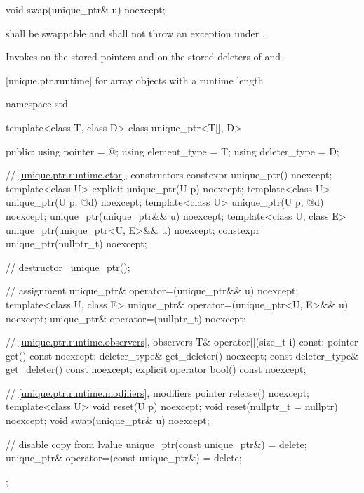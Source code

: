 %
\begin{itemdecl}
void swap(unique_ptr& u) noexcept;
\end{itemdecl}

\begin{itemdescr}
\pnum
\requires {} shall be
swappable and shall
not throw an exception
under .

\pnum
\effects
Invokes  on the stored pointers and on the stored
deleters of  and .
\end{itemdescr}

[unique.ptr.runtime]{ for array objects with a runtime length}

%
\begin{codeblock}
namespace std {
  template<class T, class D> class unique_ptr<T[], D> {
  public:
    using pointer      = @\seebelow@;
    using element_type = T;
    using deleter_type = D;

    // \ref{unique.ptr.runtime.ctor}, constructors
    constexpr unique_ptr() noexcept;
    template<class U> explicit unique_ptr(U p) noexcept;
    template<class U> unique_ptr(U p, @\seebelow@ d) noexcept;
    template<class U> unique_ptr(U p, @\seebelow@ d) noexcept;
    unique_ptr(unique_ptr&& u) noexcept;
    template<class U, class E>
      unique_ptr(unique_ptr<U, E>&& u) noexcept;
    constexpr unique_ptr(nullptr_t) noexcept;

    // destructor
    ~unique_ptr();

    // assignment
    unique_ptr& operator=(unique_ptr&& u) noexcept;
    template<class U, class E>
      unique_ptr& operator=(unique_ptr<U, E>&& u) noexcept;
    unique_ptr& operator=(nullptr_t) noexcept;

    // \ref{unique.ptr.runtime.observers}, observers
    T& operator[](size_t i) const;
    pointer get() const noexcept;
    deleter_type& get_deleter() noexcept;
    const deleter_type& get_deleter() const noexcept;
    explicit operator bool() const noexcept;

    // \ref{unique.ptr.runtime.modifiers}, modifiers
    pointer release() noexcept;
    template<class U> void reset(U p) noexcept;
    void reset(nullptr_t = nullptr) noexcept;
    void swap(unique_ptr& u) noexcept;

    // disable copy from lvalue
    unique_ptr(const unique_ptr&) = delete;
    unique_ptr& operator=(const unique_ptr&) = delete;
  };
}
\end{codeblock}

